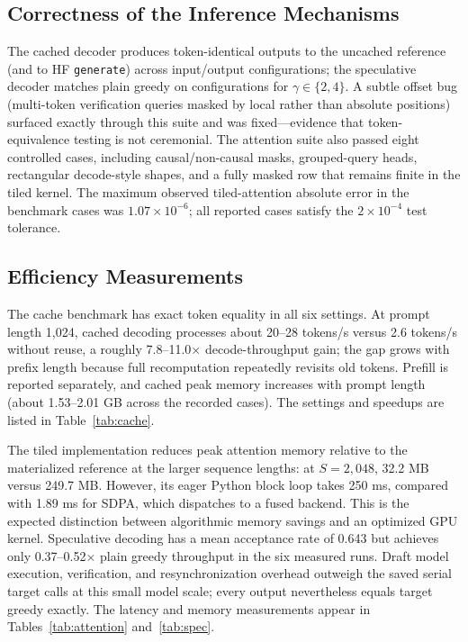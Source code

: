 \documentclass[conference]{IEEEtran}
\begin{document}
\subsection{Correctness of the Inference Mechanisms}
The cached decoder produces token-identical outputs to the uncached reference (and to HF
\texttt{generate}) across \KVEqCases{} input/output configurations; the speculative
decoder matches plain greedy on \SpecEqCases{} configurations for $\gamma\in\{2,4\}$.
A subtle offset bug (multi-token verification queries masked by local rather than
absolute positions) surfaced exactly through this suite and was fixed---evidence that
token-equivalence testing is not ceremonial. The attention suite also passed eight
controlled cases, including causal/non-causal masks, grouped-query heads, rectangular
decode-style shapes, and a fully masked row that remains finite in the tiled kernel.
The maximum observed tiled-attention absolute error in the benchmark cases was
$1.07\times10^{-6}$; all reported cases satisfy the $2\times10^{-4}$ test tolerance.

\subsection{Efficiency Measurements}



The cache benchmark has exact token equality in all six settings. At prompt length
1,024, cached decoding processes about 20--28 tokens/s versus 2.6 tokens/s without
reuse, a roughly 7.8--11.0$\times$ decode-throughput gain; the gap grows with prefix
length because full recomputation repeatedly revisits old tokens. Prefill is reported
separately, and cached peak memory increases with prompt length (about 1.53--2.01 GB
across the recorded cases).
The settings and speedups are listed in Table~\ref{tab:cache}.

The tiled implementation reduces peak attention memory relative to the materialized
reference at the larger sequence lengths: at $S=2{,}048$, 32.2 MB versus 249.7 MB.
However, its eager Python block loop takes 250 ms, compared with 1.89 ms for SDPA,
which dispatches to a fused backend. This is the expected distinction between
algorithmic memory savings and an optimized GPU kernel. Speculative decoding has a
mean acceptance rate of 0.643 but achieves only 0.37--0.52$\times$ plain greedy
throughput in the six measured runs. Draft model execution, verification, and
resynchronization overhead outweigh the saved serial target calls at this small model
scale; every output nevertheless equals target greedy exactly. The latency and memory
measurements appear in Tables~\ref{tab:attention} and~\ref{tab:spec}.
\end{document}
